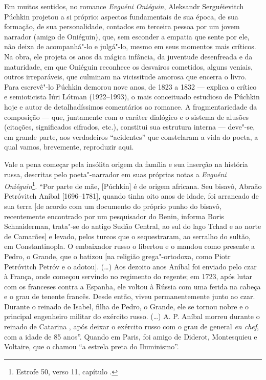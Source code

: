 Em muitos sentidos, no romance \emph{Evguéni Oniéguin},
Aleksandr Serguéievitch Púchkin
projetou a si próprio: aspectos fundamentais de sua época, de sua
formação, de sua personalidade, contados em terceira pessoa por um jovem
narrador (amigo de Oniéguin), que, sem esconder a empatia que sente por
ele, não deixa de acompanhá"-lo e julgá"-lo, mesmo em seus momentos mais
críticos. Na obra, ele projeta os anos da mágica infância, da juventude
desenfreada e da maturidade, em que Oniéguin reconhece os desvairos
cometidos, alguns veniais, outros irreparáveis, que culminam na
vicissitude amorosa que encerra o livro. Para escrevê"-lo Púchkin demorou
nove anos, de 1823 a 1832 --- explica o crítico e semioticista Iúri
Lótman (1922--1993), o mais conceituado estudioso de
Púchkin hoje e autor de detalhadíssimos comentários ao romance. A
fragmentariedade da composição --- que, juntamente com o caráter dialógico e
o sistema de alusões (citações, significados cifrados, etc.), constitui
sua estrutura interna --- deve"-se, em grande parte, aos verdadeiros
``acidentes'' que constelaram a vida do poeta, a qual vamos, brevemente,
reproduzir aqui.

Vale a pena começar pela insólita origem da família e sua inserção na
história russa, descritas pelo poeta"-narrador em suas próprias notas a
\emph{Evguéni Oniéguin}\footnote{Estrofe 50, verso 11, capítulo .}. ``Por parte
de mãe, [Púchkin] é de origem africana. Seu bisavô, Abraão
Petróvitch Aníbal [1696--1781], quando tinha oito anos de idade, foi
arrancado de sua terra [de acordo com um documento do próprio punho
do bisavô, recentemente encontrado por um pesquisador do Benin, informa
Boris Schnaiderman, trata"-se do antigo Sudão Central, ao sul do lago
Tchad e ao norte de Camarões] e levado, pelos turcos que o
sequestraram, ao serralho do sultão, em Constantinopla. O embaixador
russo o libertou e o mandou como presente a Pedro, o Grande, que o batizou [na religião grega"-ortodoxa, como Piotr
Petróvitch Petróv e o adotou]. (\ldots{}) Aos dezoito anos Aníbal foi enviado pelo czar à França, onde começou servindo no regimento do
regente; em 1723, após lutar com os franceses contra a Espanha, ele
voltou à Rússia com uma ferida na cabeça e o grau de tenente francês.
Desde então, viveu permanentemente junto ao czar. Durante o
reinado de Isabel, filha de Pedro, o Grande, ele se tornou nobre e o
principal engenheiro militar do exército russo. (\ldots{}) A. P. Aníbal
morreu durante o reinado de Catarina , após deixar o
exército russo com o grau de general \emph{en chef}, com a idade de 85
anos''. Quando em Paris, foi amigo de Diderot, Montesquieu e Voltaire,
que o chamou ``a estrela preta do Iluminismo''.

